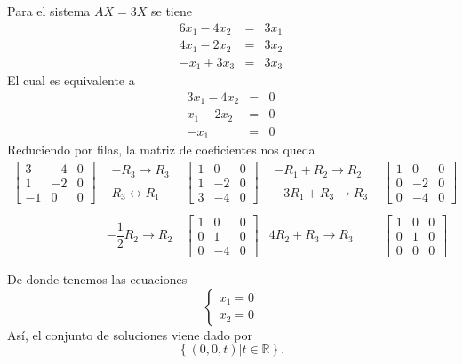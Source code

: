 \begin{enumerate}[\bfseries 1.]
	Para el sistema $AX=3X$ se tiene
	$$\begin{array}{*{3}{r}}
	    6x_1-4x_2 &=& 3x_1\\
	    4x_1-2x_2 &=& 3x_2\\
	    -x_1 +3x_3&=& 3x_3
	\end{array}$$
	El cual es equivalente a
	$$\begin{array}{*{3}{r}}
	    3x_1-4x_2 &=& 0\\
	    x_1-2x_2 &=& 0\\
	    -x_1 &=& 0
	\end{array}$$
	Reduciendo por filas, la matriz de coeficientes nos queda
	$$
	\begin{array}{*{5}{c}}
	    \left[\begin{array}{*{3}{r}}
		3 & -4 & 0\\
		1 & -2 & 0\\
		-1 & 0 & 0
	    \end{array}\right] & \begin{array}{rcl}
	    -R_3\to R_3\\\\
	    R_3\leftrightarrow R_1
	    \end{array} &
	    \left[\begin{array}{*{3}{r}}
		1 & 0 & 0\\
		1 & -2 & 0\\
		3 & -4 & 0
	    \end{array}\right]  &
	    \begin{array}{rcl}
		-R_1+R_2\to R_2 \\\\
		-3R_1+R_3\to R_3
	    \end{array}
	    &
	    \left[\begin{array}{*{3}{r}}
		1 & 0 & 0\\
		0 & -2 & 0\\
		0 & -4 & 0
	    \end{array}\right]\\\\
	    &-\dfrac{1}{2} R_2\to R_2&
	    \left[\begin{array}{*{3}{r}}
		1 & 0 & 0\\
		0 & 1 & 0\\
		0 & -4 & 0
	\end{array}\right]&
	4R_2+R_3\to R_3&
	\left[\begin{array}{*{3}{r}}
		1 & 0 & 0\\
		0 & 1 & 0\\
		0 & 0 & 0
	\end{array}\right]\\\\
	\end{array}
    	$$
	De donde tenemos las ecuaciones
	$$\left\{\begin{array}{rcl}
	    x_1=0\\
	    x_2=0
	\end{array}\right.$$ 
	Así, el conjunto de soluciones viene dado por
	$$\left\{(0,0,t)|t\in \mathbb{R}\right\}.$$\\




\end{enumerate}
